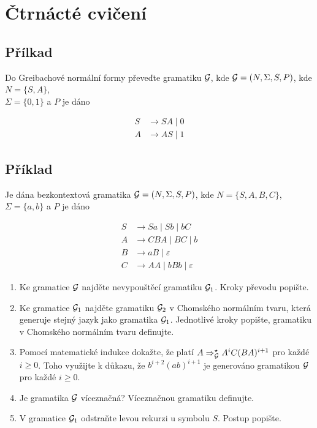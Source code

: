 \section{Čtrnácté cvičení}

\subsection{Přílkad}
Do Greibachové normální formy převeďte gramatiku $\mathcal{G}$, kde $\mathcal{G} = (N, \Sigma, S, P)$, kde $N = \{S, A\}$, 
\\$\Sigma = \{0, 1\}$ a $P$ je dáno

\begin{align*}
    S &\rightarrow SA \mid 0 \\
    A &\rightarrow AS \mid 1
\end{align*}

\subsection{Příklad}
Je dána bezkontextová gramatika $\mathcal{G} = (N, \Sigma, S, P)$, kde $N = \{S,A,B,C\}$, $\Sigma = \{a,b\}$ a $P$ je dáno

\begin{align*}
    S &\rightarrow Sa \mid Sb \mid bC \\
    A &\rightarrow CBA \mid BC \mid b \\
    B &\rightarrow aB \mid \varepsilon \\
    C &\rightarrow AA \mid bBb \mid \varepsilon
\end{align*}

\begin{enumerate}[noitemsep]
    \item Ke gramatice $\mathcal{G}$ najděte nevypouštěcí gramatiku $\mathcal{G}_1$. Kroky převodu popište.
    \item Ke gramatice $\mathcal{G}_1$ najděte gramatiku $\mathcal{G}_2$ v Chomského normálním tvaru, která generuje stejný jazyk jako 
    gramatika $\mathcal{G}_1$. Jednotlivé kroky popište, gramatiku v Chomského normálním tvaru definujte.
    \item Pomocí matematické indukce dokažte, že platí $A \Rightarrow_{\mathcal{G}}^\star A^i C (BA)^{i+1}$ pro každé $i \geq 0$.
    Toho využijte k důkazu, že $b^{i+2}(ab)^{i+1}$ je generováno gramatikou $\mathcal{G}$ pro každé $i \geq 0$.
    \item Je gramatika $\mathcal{G}$ víceznačná? Víceznačnou gramatiku definujte.
    \item V gramatice $\mathcal{G}_1$ odstraňte levou rekurzi u symbolu $S$. Postup popište.
\end{enumerate}